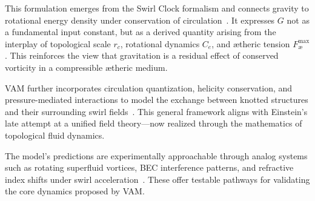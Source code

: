 This formulation emerges from the Swirl Clock formalism and connects gravity to rotational energy density under conservation of circulation~\cite{VAM-2, VAM-13}. It expresses $G$ not as a fundamental input constant, but as a derived quantity arising from the interplay of topological scale $r_c$, rotational dynamics $C_e$, and ætheric tension $F^{\max}_{\text{\ae}}$. This reinforces the view that gravitation is a residual effect of conserved vorticity in a compressible ætheric medium.

VAM further incorporates circulation quantization, helicity conservation, and pressure-mediated interactions to model the exchange between knotted structures and their surrounding swirl fields~\cite{VAM-8, VAM-11, VAM-14}. This general framework aligns with Einstein’s late attempt at a unified field theory—now realized through the mathematics of topological fluid dynamics.

The model's predictions are experimentally approachable through analog systems such as rotating superfluid vortices, BEC interference patterns, and refractive index shifts under swirl acceleration~\cite{VAM-2, VAM-13}. These offer testable pathways for validating the core dynamics proposed by VAM.

\vspace{1em}